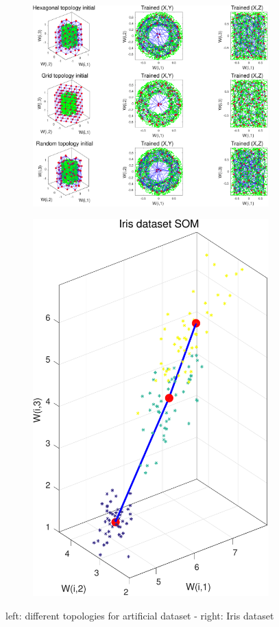 \documentclass[11pt, a4paper]{article}
\begin{document}
\begin{figure}[H]
    \centering
    \begin{subfigure}{.7\textwidth}
      \centering
      \includegraphics[width=0.8\linewidth]{SOM_cylinder.pdf}
    \end{subfigure}%
    \begin{subfigure}{.3\textwidth}
      \centering
      \includegraphics[width=0.9\linewidth]{SOM_iris.pdf}
    \end{subfigure}
    \caption{left: different topologies for artificial dataset - right:
      Iris dataset}
    \label{fig:som}
\end{figure}
\end{document}
